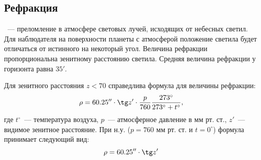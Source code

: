 \subsection{Рефракция}

~--- преломление в атмосфере световых лучей, исходящих от небесных светил. Для наблюдателя на поверхности планеты с атмосферой положение светила будет отличаться от истинного на некоторый угол. Величина рефракции пропорциональна зенитному расстоянию светила. Средняя величина рефракции у горизонта равна $35'$.

Для зенитного расстояния $z<70$ справедлива формула для величины рефракции:
\begin{equation}
\rho=60.25''\cdot\tg z'\cdot \frac{p}{760}\frac{273^{\circ}}{273^{\circ}+t^{\circ}},
\end{equation}
где $t^{\circ}$~--- температура воздуха, $p$~--- атмосферное давление в мм рт. ст., $z'$~--- видимое зенитное расстояние. При н.у. ($p=760$ мм рт. ст. и $t=0^{\circ}$) формула принимает следующий вид:
\begin{equation}
\rho=60.25''\cdot\tg z'
\end{equation}